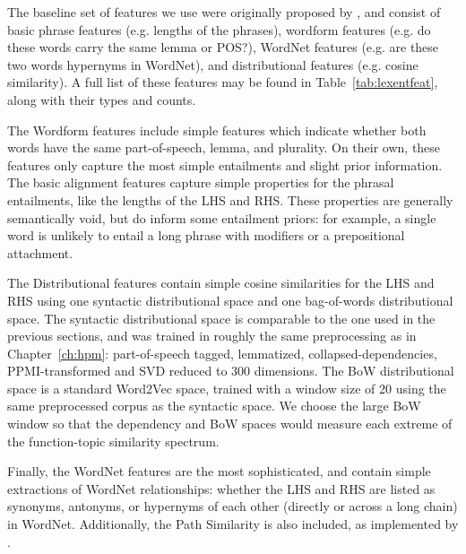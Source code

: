 The baseline set of features we use were originally proposed by
, and consist of basic phrase features
(e.g. lengths of the phrases), wordform features (e.g. do these words
carry the same lemma or POS?), WordNet features (e.g. are these two words
hypernyms in WordNet), and distributional features (e.g. cosine similarity).
A full list of these features may be found in Table~\ref{tab:lexentfeat},
along with their types and counts.

The Wordform features include simple features which indicate whether both
words have the same part-of-speech, lemma, and plurality.
On their
own, these features only capture the most simple entailments and slight prior
information. The basic alignment features capture simple properties for
the phrasal entailments, like the lengths of the LHS and RHS. These
properties are generally semantically void, but do inform some entailment
priors: for example, a single word is unlikely to entail a long phrase with
modifiers or a prepositional attachment.

The Distributional features contain simple cosine similarities for the LHS and
RHS using one syntactic distributional space and one bag-of-words
distributional space.
The syntactic distributional space is comparable
to the one used in the previous sections, and was trained in roughly the same
preprocessing as in Chapter~\ref{ch:hpm}: part-of-speech tagged, lemmatized,
collapsed-dependencies, PPMI-transformed and SVD reduced to 300 dimensions.
The BoW distributional space is a standard Word2Vec space, trained with
a window size of 20 using the same preprocessed corpus as the syntactic
space. We choose the large BoW window so that the dependency and BoW spaces
would measure each extreme of the function-topic similarity spectrum.

Finally, the WordNet features are the most sophisticated, and contain simple
extractions of WordNet relationships: whether the LHS and RHS are listed as
synonyms, antonyms, or hypernyms of each other (directly or across a long
chain) in WordNet. Additionally, the Path Similarity is also included, as
implemented by .



